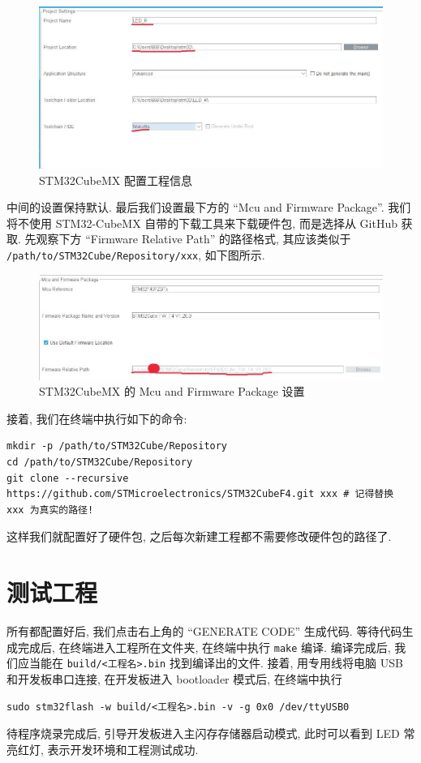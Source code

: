\begin{figure}[H]
    \centering
    \includegraphics[width=\textwidth]{images/1-newproj-configproj.jpg}
    \caption{STM32CubeMX 配置工程信息}
\end{figure}

中间的设置保持默认. 最后我们设置最下方的 ``Mcu and Firmware Package''. 我们将不使用 STM32-CubeMX 自带的下载工具来下载硬件包, 而是选择从 GitHub 获取. 先观察下方 ``Firmware Relative Path'' 的路径格式, 其应该类似于 \texttt{/path/to/STM32Cube/Repository/xxx}, 如下图所示.

\begin{figure}[H]
    \centering
    \includegraphics[width=\textwidth]{images/1-newproj-configfirm.jpg}
    \caption{STM32CubeMX 的 Mcu and Firmware Package 设置}
\end{figure}

接着, 我们在终端中执行如下的命令:

\begin{verbatim}
mkdir -p /path/to/STM32Cube/Repository
cd /path/to/STM32Cube/Repository
git clone --recursive https://github.com/STMicroelectronics/STM32CubeF4.git xxx # 记得替换 xxx 为真实的路径!
\end{verbatim}

这样我们就配置好了硬件包, 之后每次新建工程都不需要修改硬件包的路径了.

\section{测试工程} \label{1-newproj test}
所有都配置好后, 我们点击右上角的 ``GENERATE CODE'' 生成代码. 等待代码生成完成后, 在终端进入工程所在文件夹, 在终端中执行 \texttt{make} 编译. 编译完成后, 我们应当能在 \texttt{build/<工程名>.bin} 找到编译出的文件. 接着, 用专用线将电脑 USB 和开发板串口连接, 在开发板进入 bootloader 模式后, 在终端中执行

\begin{verbatim}
sudo stm32flash -w build/<工程名>.bin -v -g 0x0 /dev/ttyUSB0
\end{verbatim}

待程序烧录完成后, 引导开发板进入主闪存存储器启动模式, 此时可以看到 LED 常亮红灯, 表示开发环境和工程测试成功.
